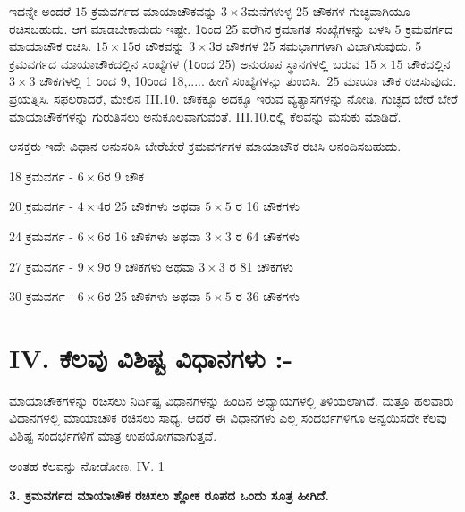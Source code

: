 	ಇದನ್ನೇ ಅಂದರೆ $15$ ಕ್ರಮವರ್ಗದ ಮಾಯಾಚೌಕವನ್ನು $3 \times 3$ಮನೆಗಳುಳ್ಳ 25 ಚೌಕಗಳ ಗುಚ್ಛವಾಗಿಯೂ ರಚಿಸಬಹುದು. ಆಗ ಮಾಡಬೇಕಾದುದು ಇಷ್ಟೇ. 1ರಿಂದ 25 ವರೆಗಿನ ಕ್ರಮಾ\-ಗತ ಸಂಖ್ಯೆಗಳನ್ನು ಬಳಸಿ $5$ ಕ್ರಮವರ್ಗದ ಮಾಯಾಚೌಕ ರಚಿಸಿ. $15 \times 15$ರ ಚೌಕ\-ವನ್ನು $3 \times 3$ರ ಚೌಕಗಳ 25 ಸಮಭಾಗಗಳಾಗಿ ವಿಭಾಗಿಸುವುದು. 5 ಕ್ರಮವರ್ಗದ ಮಾಯಾಚೌಕದಲ್ಲಿನ ಸಂಖ್ಯೆಗಳ (1ರಿಂದ 25) ಅನುರೂಪ ಸ್ಥಾನಗಳಲ್ಲಿ ಬರುವ $15 \times 15$ ಚೌಕ\-ದಲ್ಲಿನ $3 \times 3$ ಚೌಕಗಳಲ್ಲಿ 1 ರಿಂದ 9, 10ರಿಂದ 18,..... ಹೀಗೆ ಸಂಖ್ಯೆಗಳನ್ನು \hbox{ತುಂಬಿಸಿ. $25$} \break ಮಾಯಾ ಚೌಕ ರಚಿಸುವುದು. ಪ್ರಯತ್ನಿಸಿ. ಸಫಲರಾದರೆ, ಮೇಲಿನ  III.10. ಚೌಕಕ್ಕೂ \break ಅದಕ್ಕೂ ಇರುವ ವ್ಯತ್ಯಾಸಗಳನ್ನು ನೋಡಿ. ಗುಚ್ಛದ ಬೇರೆ ಬೇರೆ ಮಾಯಾಚೌಕಗಳನ್ನು ಗುರುತಿ\-ಸಲು ಅನುಕೂಲವಾಗುವಂತೆ.  III.10.ರಲ್ಲಿ ಕೆಲವನ್ನು ಮಸುಕು ಮಾಡಿದೆ.

	ಆಸಕ್ತರು ಇದೇ ವಿಧಾನ ಅನುಸರಿಸಿ ಬೇರೆಬೇರೆ ಕ್ರಮವರ್ಗಗಳ ಮಾಯಾಚೌಕ ರಚಿಸಿ ಆನಂದಿಸಬಹುದು.

	18 ಕ್ರಮವರ್ಗ - $6 \times 6$ರ 9 ಚೌಕ

	20 ಕ್ರಮವರ್ಗ - $4 \times 4$ರ 25 ಚೌಕಗಳು ಅಥವಾ $5 \times 5$ ರ 16 ಚೌಕಗಳು

	24 ಕ್ರಮವರ್ಗ - $6 \times 6$ರ 16 ಚೌಕಗಳು ಅಥವಾ $3 \times 3$ ರ 64 ಚೌಕಗಳು

	27 ಕ್ರಮವರ್ಗ - $9 \times 9$ರ 9 ಚೌಕಗಳು ಅಥವಾ $3 \times 3$ ರ 81 ಚೌಕಗಳು

	30 ಕ್ರಮವರ್ಗ - $6 \times 6$ರ 25 ಚೌಕಗಳು ಅಥವಾ $5 \times 5$ ರ 36 ಚೌಕಗಳು

\section*{IV. ಕೆಲವು ವಿಶಿಷ್ಟ ವಿಧಾನಗಳು :-}

ಮಾಯಾಚೌಕಗಳನ್ನು ರಚಿಸಲು ನಿರ್ದಿಷ್ಟ ವಿಧಾನಗಳನ್ನು ಹಿಂದಿನ ಅಧ್ಯಾಯಗಳಲ್ಲಿ ತಿಳಿಯಲಾಗಿದೆ. ಮತ್ತೂ ಹಲವಾರು ವಿಧಾನಗಳಲ್ಲಿ ಮಾಯಾಚೌಕ ರಚಿಸಲು ಸಾಧ್ಯ. ಆದರೆ ಈ ವಿಧಾನಗಳು ಎಲ್ಲ ಸಂದರ್ಭಗಳಿಗೂ ಅನ್ವಯಿಸದೇ ಕೆಲವು ವಿಶಿಷ್ಟ ಸಂದರ್ಭಗಳಿಗೆ ಮಾತ್ರ ಉಪಯೋಗವಾಗುತ್ತವೆ.

ಅಂತಹ ಕೆಲವನ್ನು ನೋಡೋಣ. IV. 1

\noindent \textbf{3. ಕ್ರಮವರ್ಗದ ಮಾಯಾಚೌಕ ರಚಿಸಲು ಶ್ಲೋಕ ರೂಪದ ಒಂದು ಸೂತ್ರ ಹೀಗಿದೆ.}

